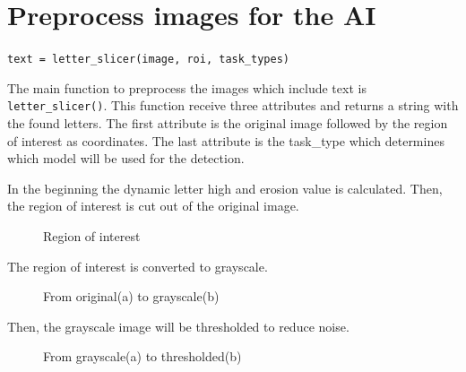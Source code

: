 \author{Florian Müller}
\section {Preprocess images for the AI}

\texttt{text = letter\_slicer(image, roi, task\_types)}

The main function to preprocess the images which include text is \texttt{letter\_slicer()}.
This function receive three attributes and returns a string with the found letters.
The first attribute is the original image followed by the region of interest as coordinates.
The last attribute is the task\_type which determines which model will be used for the detection.

In the beginning the dynamic letter high and erosion value is calculated.
Then, the region of interest is cut out of the original image.

\begin{figure}[H]
    \centering
    \caption{Region of interest}
\end{figure}

The region of interest is converted to grayscale.

\begin{figure}[H]
    \centering
    \qquad
    \caption{From original(a) to grayscale(b)}
\end{figure}

Then, the grayscale image will be thresholded to reduce noise.

\begin{figure}[H]
    \centering
    \qquad
    \caption{From grayscale(a) to thresholded(b)}
\end{figure}

